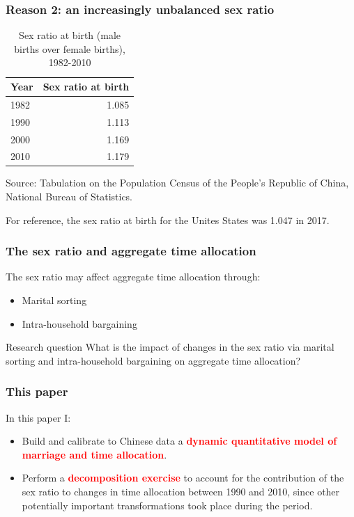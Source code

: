\documentclass{beamer}
\newcommand{\source}[1]{\caption*{Source: {#1}} }
\begin{document}
\begin{frame}
	\frametitle{Reason 2: an increasingly unbalanced sex ratio}
	
	\begin{table}[htbp]
		\centering
		\caption{Sex ratio at birth (male births over female births), 1982-2010}\label{slide:sex_ratio_birth}
		\begin{tabular}{lr}
			\toprule
			Year & \multicolumn{1}{l}{Sex ratio at birth} \\
			\midrule
			1982 & 1.085 \\
			1990 & 1.113 \\
			2000 & 1.169 \\
			2010 & 1.179 \\
			\bottomrule
			\bottomrule
		\end{tabular}
		\label{srb_census}
		\source{Tabulation on the Population Census of the People's Republic of China, National Bureau of Statistics.}
	\end{table}
	
	For reference, the sex ratio at birth for the Unites States was 1.047 in 2017. \\
	\hyperlink{slide:sex_ratio_20_35}{}
\end{frame}

\begin{frame}
	\frametitle{The sex ratio and aggregate time allocation}
	
	The sex ratio may affect aggregate time allocation through:
	\begin{itemize}
		\item Marital sorting
		\item Intra-household bargaining
	\end{itemize}

	\begin{block}{Research question}
	What is the impact of changes in the sex ratio via marital sorting and intra-household bargaining on aggregate time allocation?
	\end{block}
\end{frame}

\begin{frame}
	\frametitle{This paper}
	In this paper I:
	\begin{itemize}
		\item Build and calibrate to Chinese data a \textbf{\textcolor{red}{dynamic quantitative model of marriage and time allocation}}.
		\item Perform a \textbf{\textcolor{red}{decomposition exercise}} to account for the contribution of the sex ratio to changes in time allocation between 1990 and 2010, since other potentially important transformations took place during the period.
	\end{itemize}
\end{frame}
\end{document}
